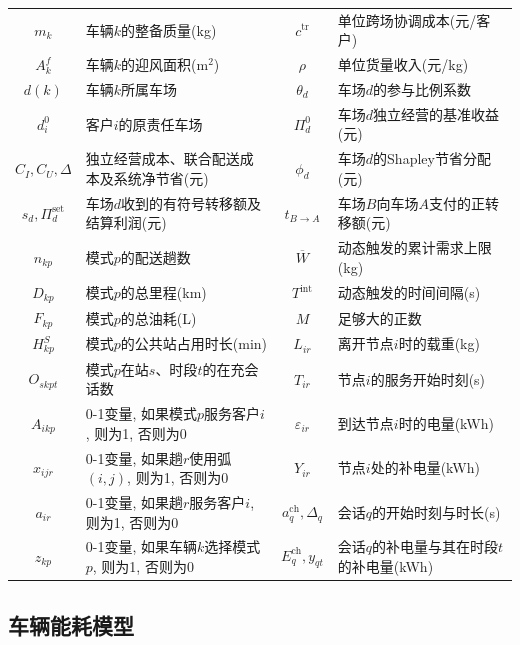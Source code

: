\documentclass{setp-new}
\begin{document}
\begin{table}[H]
\begin{tabular*}{\linewidth}{@{\extracolsep{\fill}}cJcJ@{}}
$m_k$ & 车辆$k$的整备质量(kg) & $c^{\mathrm{tr}}$ & 单位跨场协调成本(元/客户)\\
$A_k^f$ & 车辆$k$的迎风面积(m$^2$) & $\rho$ & 单位货量收入(元/kg)\\
$d(k)$ & 车辆$k$所属车场 & $\theta_d$ & 车场$d$的参与比例系数\\
$d_i^0$ & 客户$i$的原责任车场 & $\Pi_d^0$ & 车场$d$独立经营的基准收益(元)\\
$C_I,C_U,\Delta$ & 独立经营成本、联合配送成本及系统净节省(元)
& $\phi_d$ & 车场$d$的Shapley节省分配(元)\\
$s_d,\Pi_d^{\mathrm{set}}$ & 车场$d$收到的有符号转移额及结算利润(元)
& $t_{B\to A}$ & 车场$B$向车场$A$支付的正转移额(元)\\
$n_{kp}$ & 模式$p$的配送趟数 & $\overline W$ & 动态触发的累计需求上限(kg)\\
$D_{kp}$ & 模式$p$的总里程(km) & $T^{\mathrm{int}}$ & 动态触发的时间间隔(s)\\
$F_{kp}$ & 模式$p$的总油耗(L) & $M$ & 足够大的正数\\
$H_{kp}^{S}$ & 模式$p$的公共站占用时长(min) & $L_{ir}$ & 离开节点$i$时的载重(kg)\\
$O_{skpt}$ & 模式$p$在站$s$、时段$t$的在充会话数 & $T_{ir}$ & 节点$i$的服务开始时刻(s)\\
$A_{ikp}$ & 0-1变量, 如果模式$p$服务客户$i$, 则为1, 否则为0 & $\varepsilon_{ir}$ & 到达节点$i$时的电量(kWh)\\
$x_{ijr}$ & 0-1变量, 如果趟$r$使用弧$(i,j)$, 则为1, 否则为0 & $Y_{ir}$ & 节点$i$处的补电量(kWh)\\
$a_{ir}$ & 0-1变量, 如果趟$r$服务客户$i$, 则为1, 否则为0 & $a_q^{\mathrm{ch}},\Delta_q$ & 会话$q$的开始时刻与时长(s)\\
$z_{kp}$ & 0-1变量, 如果车辆$k$选择模式$p$, 则为1, 否则为0 & $E_q^{\mathrm{ch}},y_{qt}$ & 会话$q$的补电量与其在时段$t$的补电量(kWh)\\
\bottomrule
\end{tabular*}
\end{table}

\subsection{车辆能耗模型}
\end{document}
